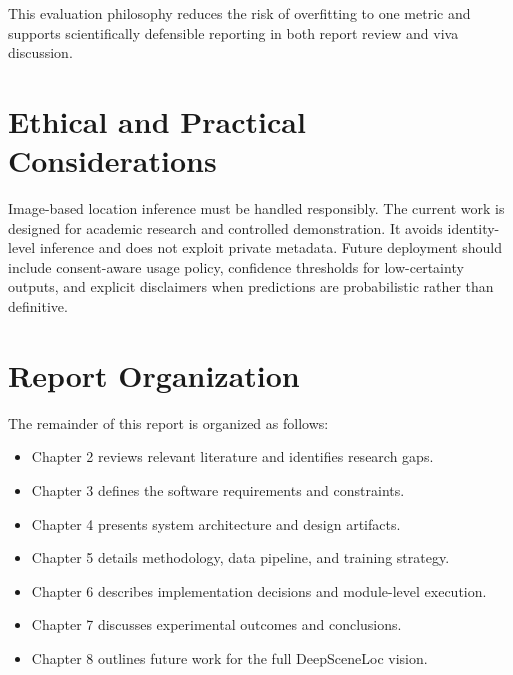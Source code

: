 This evaluation philosophy reduces the risk of overfitting to one metric and supports scientifically defensible reporting in both report review and viva discussion.

\section{Ethical and Practical Considerations}
Image-based location inference must be handled responsibly. The current work is designed for academic research and controlled demonstration. It avoids identity-level inference and does not exploit private metadata. Future deployment should include consent-aware usage policy, confidence thresholds for low-certainty outputs, and explicit disclaimers when predictions are probabilistic rather than definitive.

\section{Report Organization}
The remainder of this report is organized as follows:
\begin{itemize}
\item Chapter 2 reviews relevant literature and identifies research gaps.
\item Chapter 3 defines the software requirements and constraints.
\item Chapter 4 presents system architecture and design artifacts.
\item Chapter 5 details methodology, data pipeline, and training strategy.
\item Chapter 6 describes implementation decisions and module-level execution.
\item Chapter 7 discusses experimental outcomes and conclusions.
\item Chapter 8 outlines future work for the full DeepSceneLoc vision.
\end{itemize}


